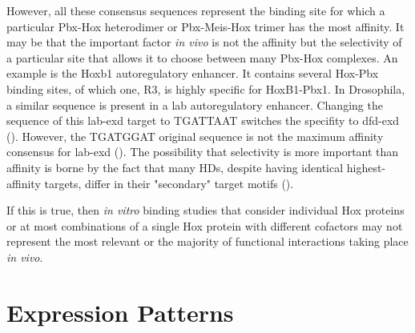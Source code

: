 




However, all these consensus sequences represent the binding site for which a particular Pbx-Hox heterodimer or Pbx-Meis-Hox trimer has the most affinity. It may be that the important factor \textit{in vivo} is not the affinity but the selectivity of a particular site that allows it to choose between many Pbx-Hox complexes. An example is the Hoxb1 autoregulatory enhancer. It contains several Hox-Pbx binding sites, of which one, R3, is highly specific for HoxB1-Pbx1. In Drosophila, a similar sequence is present in a \ac{lab} autoregulatory enhancer. Changing the sequence of this lab-\ac{exd} target to TGATTAAT switches the specifity to dfd-\ac{exd} (\cite{Chan1997}). However, the TGATGGAT original sequence is not the maximum affinity consensus for lab-\ac{exd} (\cite{Mann1998,Shen1997}). The possibility that selectivity is more important than affinity is borne by the fact that many \acp{HD}, despite having identical highest-affinity targets, differ in their "secondary" target motifs (\cite{Berger2008}). %

If this is true, then \textit{in vitro} binding studies that consider individual Hox proteins or at most combinations of a single Hox protein with different cofactors may not represent the most relevant or the majority of functional interactions taking place \textit{in vivo}. 


\section{Expression Patterns}


